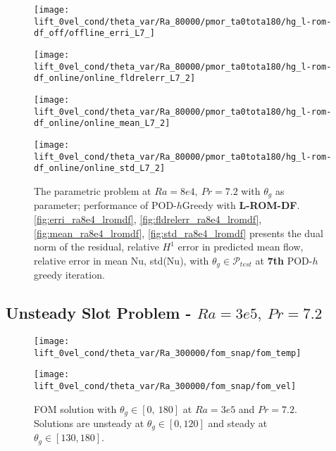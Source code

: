\begin{figure}[h!]
    \begin{minipage}[b]{.25\linewidth}
        \centering \texttt{[image: lift\_0vel\_cond/theta\_var/Ra\_80000/pmor\_ta0tota180/hg\_l-rom-df\_off/offline\_erri\_L7\_]}
        \label{fig:erri_ra8e4_lromdf}
    \end{minipage}%
    \begin{minipage}[b]{.25\linewidth}
        \centering \texttt{[image: lift\_0vel\_cond/theta\_var/Ra\_80000/pmor\_ta0tota180/hg\_l-rom-df\_online/online\_fldrelerr\_L7\_2]}
        \label{fig:fldrelerr_ra8e4_lromdf}
    \end{minipage}
    \begin{minipage}[b]{.25\linewidth}
        \centering \texttt{[image: lift\_0vel\_cond/theta\_var/Ra\_80000/pmor\_ta0tota180/hg\_l-rom-df\_online/online\_mean\_L7\_2]}
        \label{fig:mean_ra8e4_lromdf}
    \end{minipage}%
    \begin{minipage}[b]{.25\linewidth}
        \centering \texttt{[image: lift\_0vel\_cond/theta\_var/Ra\_80000/pmor\_ta0tota180/hg\_l-rom-df\_online/online\_std\_L7\_2]}
        \label{fig:std_ra8e4_lromdf}
    \end{minipage} 
    \caption{The parametric problem at $Ra=8e4,~Pr=7.2$ with $\theta_g$ as
    parameter; performance of POD-$h$Greedy with \textbf{L-ROM-DF}.  \ref{fig:erri_ra8e4_lromdf},
    \ref{fig:fldrelerr_ra8e4_lromdf}, \ref{fig:mean_ra8e4_lromdf}, \ref{fig:std_ra8e4_lromdf}
    presents the dual norm of the residual, relative $H^1$ error in predicted
    mean flow, relative error in mean Nu, std(Nu), with $\theta_g \in
    \mathcal{P}_{test}$ at \textbf{7th} POD-$h$greedy iteration.}
    \label{fig:online_ra8e4_lromdf} 
\end{figure}
\clearpage
\subsection{Unsteady Slot Problem - $Ra=3e5,~Pr=7.2$}
\begin{figure}[h!]
    \begin{minipage}[b]{.5\linewidth}
   \centering 
   \texttt{[image: lift\_0vel\_cond/theta\_var/Ra\_300000/fom\_snap/fom\_temp]}
    \end{minipage}%
    \begin{minipage}[b]{.5\linewidth}
   \texttt{[image: lift\_0vel\_cond/theta\_var/Ra\_300000/fom\_snap/fom\_vel]}
    \end{minipage} \caption{FOM solution with $\theta_g \in [0,~180]$ at
    $Ra=3e5$ and $Pr=7.2$. Solutions are unsteady at $\theta_g \in [0, 120]$ and
    steady at $\theta_g \in [130, 180]$.}
\label{fig:slot_pr_7.2_fom_sol} \end{figure}
